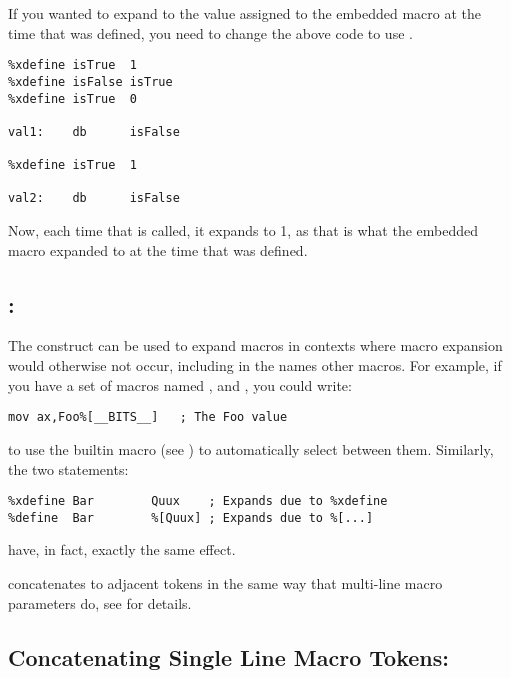 If you wanted  to expand to the value assigned to the
embedded macro  at the time that  was defined,
you need to change the above code to use .

\begin{lstlisting}
%xdefine isTrue  1
%xdefine isFalse isTrue
%xdefine isTrue  0

val1:    db      isFalse

%xdefine isTrue  1

val2:    db      isFalse
\end{lstlisting}

Now, each time that  is called, it expands to 1,
as that is what the embedded macro  expanded to at
the time that  was defined.

\subsection{: \indexcode{\%[}\code{\%[...]}}
\label{subsec:indmacro}

The \code{\%[...]} construct can be used to expand macros in contexts
where macro expansion would otherwise not occur, including in the
names other macros. For example, if you have a set of macros named
,  and , you could write:

\begin{lstlisting}
mov ax,Foo%[__BITS__]	; The Foo value
\end{lstlisting}

to use the builtin macro  (see )
to automatically select between them. Similarly, the two statements:

\begin{lstlisting}
%xdefine Bar		Quux	; Expands due to %xdefine
%define  Bar		%[Quux]	; Expands due to %[...]
\end{lstlisting}

have, in fact, exactly the same effect.

\code{\%[...]} concatenates to adjacent tokens in the same way that
multi-line macro parameters do, see  for details.

\subsection{Concatenating Single Line Macro Tokens: \codeindex{\%+}}
\label{subsec:concatmacro}

